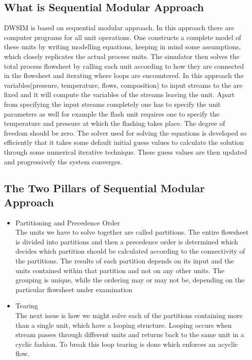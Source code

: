 \documentclass[12pt]{report}
\begin{document}
\subsection{What is Sequential Modular Approach}
DWSIM is based on sequential modular approach. In this approach there are computer programs for all unit operations. One constructs a complete model of these units by writing modelling equations, keeping in mind some assumptions, which closely replicates the actual process units. The simulator then solves the total process flowsheet by calling each unit according to how they are connected in the flowsheet and iterating where loops are encountered. In this approach the variables(pressure, temperature, flows, composition) to input streams to the are fixed and it will compute the variables of the streams leaving the unit. Apart from specifying the input streams completely one has to specify the unit parameters as well for example the flash unit requires one to specify the temperature and pressure at which the flashing takes place. The degree of freedom should be zero. The solver used for solving the equations is developed so efficiently that it takes some default initial guess values to calculate the solution through some numerical iterative technique. These guess values are then updated and progressively the system converges.

\subsection{The Two Pillars of Sequential Modular Approach}
\begin{itemize}
\item{Partitioning and Precedence Order} \\
The units we have to solve together are called partitions. The entire flowsheet is divided into partitions and then a precedence order is determined which decides which partition should be calculated according to the connectivity of the partitions. The results of each partition depends on its input and the units contained within that partition and not on any other units. The grouping is unique, while the ordering may or may not be, depending on the particular flowsheet under examination
\item{Tearing} \\
The next issue is how we might solve each of the partitions containing more than a single unit, which have a looping structure. Looping occurs when stream passes through different units and returns back to the same unit in a cyclic fashion. To break this loop tearing is done which enforces an acyclic flow.
\end{itemize}
\end{document}
